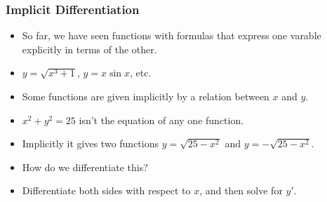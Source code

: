 \begin{frame}
\frametitle{Implicit Differentiation}
\begin{itemize}
\item  So far, we have seen functions with formulas that express one varable explicitly in terms of the other.
\item<2->  $y = \sqrt{x^3+1}$, $y = x\sin x$, etc.
\item<3->  Some functions are given implicitly by a relation between $x$ and $y$.
\item<4->  $x^2 + y^2 = 25$ isn't the equation of any one function.
\item<5->  Implicitly it gives two functions $y = \sqrt{25-x^2}$ and $y = -\sqrt{25-x^2}$.
\item<6->  How do we differentiate this?
\item<7->  Differentiate both sides with respect to $x$, and then solve for $y'$.
\end{itemize}
\begin{center}
\ %
\ %
\ %
\end{center}
\end{frame}
